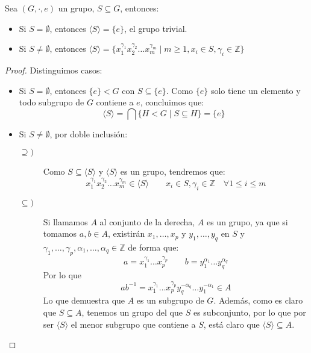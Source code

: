 \begin{prop}\label{prop:subgrupos_generados}
    Sea $(G,\cdot ,e)$ un grupo, $S\subseteq G$, entonces:
    \begin{itemize}
        \item Si $S = \emptyset $, entonces $\langle S \rangle = \{e\}$, el grupo trivial.
        \item Si $S\neq \emptyset $, entonces $\langle S \rangle = \{x_1^{\gamma_1}x_2^{\gamma_2}\ldots x_m^{\gamma_m} \mid m \geq 1, x_i \in S, \gamma_i \in \mathbb{Z}\}$
    \end{itemize} 
    \begin{proof}
        Distinguimos casos:
        \begin{itemize}
            \item Si $S=\emptyset $, entonces $\{e\} < G$ con $S\subseteq \{e\}$. Como $\{e\}$ solo tiene un elemento y todo subgrupo de $G$ contiene a $e$, concluimos que:
                \begin{equation*}
                    \langle S \rangle = \bigcap \{H < G \mid S \subseteq H\} = \{e\}
                \end{equation*}
            \item Si $S\neq \emptyset $, por doble inclusión:
                \begin{description}
                    \item [$\supseteq)$] Como $S\subseteq \langle S\rangle$ y $\langle S\rangle$ es un grupo, tendremos que:
                        \begin{equation*}
                            x_1^{\gamma_1}x_2^{\gamma_2}\ldots x_m^{\gamma_m} \in \langle S\rangle \qquad x_i \in S, \gamma_i \in \mathbb{Z}\quad \forall 1\leq i \leq m
                        \end{equation*}
                    \item [$\subseteq)$] Si llamamos $A$ al conjunto de la derecha, $A$ es un grupo, ya que si tomamos $a,b\in A$, existirán $x_1,\ldots,x_p$ y $y_1,\ldots,y_q$ en $S$ y $\gamma_1,\ldots,\gamma_p,\alpha_1,\ldots,\alpha_q\in \mathbb{Z}$ de forma que:
                        \begin{equation*}
                            a = x_1^{\gamma_1} \ldots x_p^{\gamma_p} \qquad b = y_1^{\alpha_1} \ldots y_q^{\alpha_q
}                        \end{equation*}
                        Por lo que
                        \begin{equation*}
                            ab^{-1} = x_1^{\gamma_1} \ldots x_p^{\gamma_p} y_q^{-\alpha_q} \ldots y_1^{-\alpha_1} \in A
                        \end{equation*}
                        Lo que demuestra que $A$ es un subgrupo de $G$. Además, como es claro que $S\subseteq A$, tenemos un grupo del que $S$ es subconjunto, por lo que por ser $\langle S\rangle$ el menor subgrupo que contiene a $S$, está claro que $\langle S\rangle\subseteq A$.\qedhere
                \end{description}
        \end{itemize}
    \end{proof}
\end{prop}

